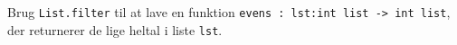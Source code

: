 Brug \lstinline{List.filter} til at lave en funktion \lstinline{evens : lst:int list -> int list}, der returnerer de lige heltal i liste \lstinline{lst}.
